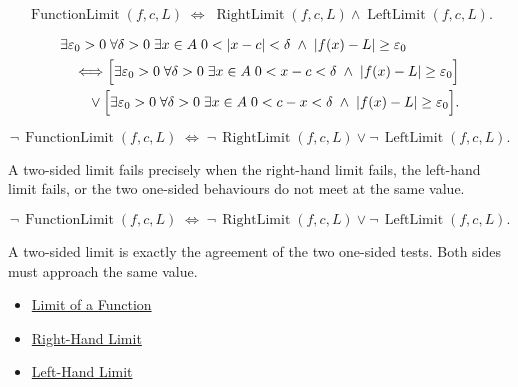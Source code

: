 \begin{remark*}
\[
  \operatorname{FunctionLimit}(f,c,L)
  \;\Longleftrightarrow\;
  \operatorname{RightLimit}(f,c,L)\wedge\operatorname{LeftLimit}(f,c,L).
\]
\end{remark*}

\begin{remark*}
\[
\begin{aligned}
&\exists\varepsilon_0>0\;\forall\delta>0\;\exists x\in A\;
  0<|x-c|<\delta\;\wedge\; |f(x)-L|\geq\varepsilon_0 \\
&\quad\Longleftrightarrow
\Bigl[\exists\varepsilon_0>0\;\forall\delta>0\;\exists x\in A\;
  0<x-c<\delta\;\wedge\; |f(x)-L|\geq\varepsilon_0\Bigr] \\
&\qquad\vee
\Bigl[\exists\varepsilon_0>0\;\forall\delta>0\;\exists x\in A\;
  0<c-x<\delta\;\wedge\; |f(x)-L|\geq\varepsilon_0\Bigr].
\end{aligned}
\]
\end{remark*}

\begin{remark*}
\[
  \neg\,\operatorname{FunctionLimit}(f,c,L)
  \;\Longleftrightarrow\;
  \neg\,\operatorname{RightLimit}(f,c,L)\vee\neg\,\operatorname{LeftLimit}(f,c,L).
\]
\end{remark*}

\begin{remark*}
A two-sided limit fails precisely when the right-hand limit fails, the
left-hand limit fails, or the two one-sided behaviours do not meet at the
same value.
\end{remark*}

\begin{remark*}
\[
  \neg\,\operatorname{FunctionLimit}(f,c,L)
  \;\Longleftrightarrow\;
  \neg\,\operatorname{RightLimit}(f,c,L)\vee\neg\,\operatorname{LeftLimit}(f,c,L).
\]
\end{remark*}

\begin{remark*}[Interpretation]
A two-sided limit is exactly the agreement of the two one-sided tests.
Both sides must approach the same value.
\end{remark*}

\begin{dependencies}
\begin{itemize}
  \item \hyperref[def:limit-function]{Limit of a Function}
  \item \hyperref[def:right-hand-limit]{Right-Hand Limit}
  \item \hyperref[def:left-hand-limit]{Left-Hand Limit}
\end{itemize}
\end{dependencies}

